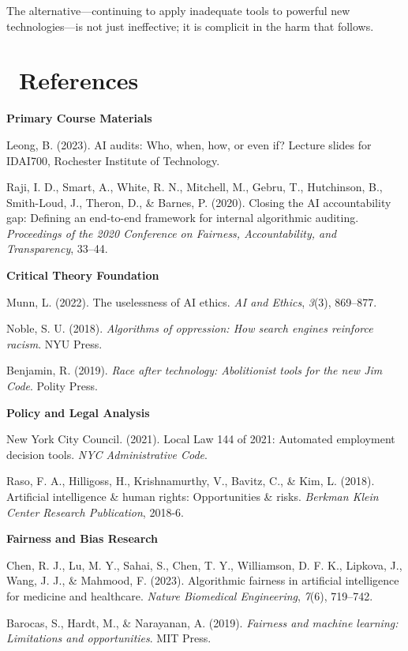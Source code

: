 \documentclass[12pt,letterpaper]{article}
\begin{document}
The alternative—continuing to apply inadequate tools to powerful new technologies—is not just ineffective; it is complicit in the harm that follows.

\newpage

\section*{\faBook\ References}

\textbf{Primary Course Materials}

Leong, B. (2023). AI audits: Who, when, how, or even if? Lecture slides for IDAI700, Rochester Institute of Technology.

Raji, I. D., Smart, A., White, R. N., Mitchell, M., Gebru, T., Hutchinson, B., Smith-Loud, J., Theron, D., \& Barnes, P. (2020). Closing the AI accountability gap: Defining an end-to-end framework for internal algorithmic auditing. \textit{Proceedings of the 2020 Conference on Fairness, Accountability, and Transparency}, 33–44.

\textbf{Critical Theory Foundation}

Munn, L. (2022). The uselessness of AI ethics. \textit{AI and Ethics}, \textit{3}(3), 869–877.

Noble, S. U. (2018). \textit{Algorithms of oppression: How search engines reinforce racism}. NYU Press.

Benjamin, R. (2019). \textit{Race after technology: Abolitionist tools for the new Jim Code}. Polity Press.

\textbf{Policy and Legal Analysis}

New York City Council. (2021). Local Law 144 of 2021: Automated employment decision tools. \textit{NYC Administrative Code}.

Raso, F. A., Hilligoss, H., Krishnamurthy, V., Bavitz, C., \& Kim, L. (2018). Artificial intelligence \& human rights: Opportunities \& risks. \textit{Berkman Klein Center Research Publication}, 2018-6.

\textbf{Fairness and Bias Research}

Chen, R. J., Lu, M. Y., Sahai, S., Chen, T. Y., Williamson, D. F. K., Lipkova, J., Wang, J. J., \& Mahmood, F. (2023). Algorithmic fairness in artificial intelligence for medicine and healthcare. \textit{Nature Biomedical Engineering}, \textit{7}(6), 719–742.

Barocas, S., Hardt, M., \& Narayanan, A. (2019). \textit{Fairness and machine learning: Limitations and opportunities}. MIT Press.
\end{document}
